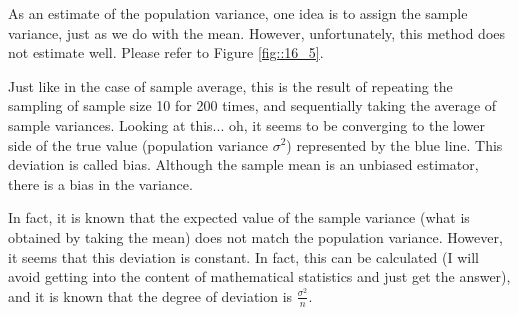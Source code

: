 \documentclass{ltjsbook}
\begin{document}
As an estimate of the population variance, one idea is to assign the sample variance, just as we do with the mean. However, unfortunately, this method does not estimate well. Please refer to Figure \ref{fig::16_5}.


Just like in the case of sample average, this is the result of repeating the sampling of sample size 10 for 200 times, and sequentially taking the average of sample variances. Looking at this... oh, it seems to be converging to the lower side of the true value (population variance $\sigma^2$) represented by the blue line. This deviation is called bias. Although the sample mean is an unbiased estimator, there is a bias in the variance.

In fact, it is known that the expected value of the sample variance (what is obtained by taking the mean) does not match the population variance. However, it seems that this deviation is constant. In fact, this can be calculated (I will avoid getting into the content of mathematical statistics and just get the answer), and it is known that the degree of deviation is $\frac{\sigma^2}{n}$.
\end{document}
